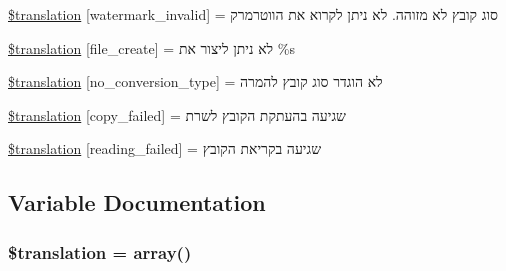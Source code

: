\begin{DoxyCompactItemize}
\item 
\hyperlink{class_8upload_8he___i_l_8php_ac336e7a5701e47ba4a05e9e498a3cc44}{\$translation} \mbox{[}\textquotesingle{}watermark\+\_\+invalid\textquotesingle{}\mbox{]} = \textquotesingle{}סוג קובץ לא מזוהה. לא ניתן לקרוא את הווטרמרק\textquotesingle{}
\item 
\hyperlink{class_8upload_8he___i_l_8php_a1ecb4673e4fb69e06b3f20b65cecf30a}{\$translation} \mbox{[}\textquotesingle{}file\+\_\+create\textquotesingle{}\mbox{]} = \textquotesingle{}לא ניתן ליצור את \%s \textquotesingle{}
\item 
\hyperlink{class_8upload_8he___i_l_8php_a4712d7ec28e9a7f17eb3338af2358363}{\$translation} \mbox{[}\textquotesingle{}no\+\_\+conversion\+\_\+type\textquotesingle{}\mbox{]} = \textquotesingle{}לא הוגדר סוג קובץ להמרה\textquotesingle{}
\item 
\hyperlink{class_8upload_8he___i_l_8php_a783c9358bcf54a054545b50098bc679b}{\$translation} \mbox{[}\textquotesingle{}copy\+\_\+failed\textquotesingle{}\mbox{]} = \textquotesingle{}שגיעה בהעתקת הקובץ לשרת\textquotesingle{}
\item 
\hyperlink{class_8upload_8he___i_l_8php_a01bea14c9fd5f353f62db44beabfcd42}{\$translation} \mbox{[}\textquotesingle{}reading\+\_\+failed\textquotesingle{}\mbox{]} = \textquotesingle{}שגיעה בקריאת הקובץ\textquotesingle{}
\end{DoxyCompactItemize}


\subsection{Variable Documentation}
\hypertarget{class_8upload_8he___i_l_8php_a1f198d410fecc3871ebdd468d343a5e3}{}
\subsubsection[{\$translation}]{\setlength{\rightskip}{0pt plus 5cm}\$translation = array()}\label{class_8upload_8he___i_l_8php_a1f198d410fecc3871ebdd468d343a5e3}
\hypertarget{class_8upload_8he___i_l_8php_ac7498e49b9771b04698029aa61c70821}{}
